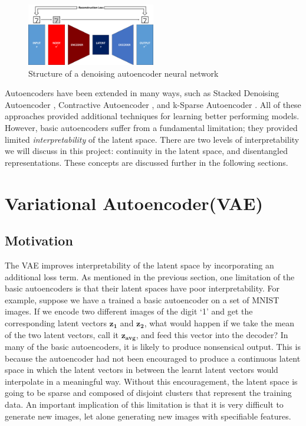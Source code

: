         \begin{figure}[H]
            \centering
            \includegraphics[width=0.5\textwidth]{imgs/denoising_ae.png}
            \caption{Structure of a denoising autoencoder neural network}
            \label{fig:dae}
        \end{figure}
        
        Autoencoders have been extended in many ways, such as Stacked Denoising Autoencoder \citep{vincent2010stacked}, Contractive Autoencoder \citep{rifai2011higher}, and k-Sparse Autoencoder \citep{makhzani2013k}. All of these approaches provided additional techniques for learning better performing models. However, basic autoencoders suffer from a fundamental limitation; they provided limited \textit{interpretability} of the latent space. There are two levels of interpretability we will discuss in this project: continuity in the latent space, and disentangled representations. These concepts are discussed further in the following sections.
        
    \section{Variational Autoencoder(VAE)}
        \subsection{Motivation}
            The VAE \citep{kingma2013auto} improves interpretability of the latent space by incorporating an additional loss term. As mentioned in the previous section, one limitation of the basic autoencoders is that their latent spaces have poor interpretability. For example, suppose we have a trained a basic autoencoder on a set of MNIST images. If we encode two different images of the digit `1' and get the corresponding latent vectors $\bm{z_1}$ and $\bm{z_2}$, what would happen if we take the mean of the two latent vectors, call it $\bm{z_{avg}}$, and feed this vector into the decoder? In many of the basic autoencoders, it is likely to produce nonsensical output. This is because the autoencoder had not been encouraged to produce a continuous latent space in which the latent vectors in between the learnt latent vectors would interpolate in a meaningful way. Without this encouragement, the latent space is going to be sparse and composed of disjoint clusters that represent the training data. An important implication of this limitation is that it is very difficult to generate new images, let alone generating new images with specifiable features.
            
